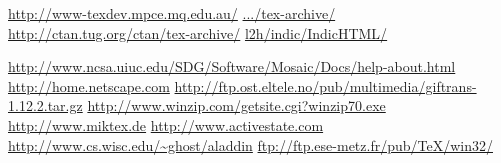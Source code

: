 \begin{htmlonly}
%
\internal{}%
%
%
%
%
%
%

\newcommand{\texdev}[1]{\htmladdnormallink
 {\texdevURL/#1}{\texdevURL/#1}}
\newcommand{\ctan}{http://ctan.tug.org/ctan}
\newcommand{\ctanTUG}{\htmladdnormallinkfoot
 {TUG's searchable CTAN site}{\ctan}}
\newcommand{\ctanURL}[1]{\htmladdnormallink
 {CTAN:\texttt{.../#1}}{\ctan/tex-archive/#1}}
\newcommand{\ctanURLbr}[1]{\htmladdnormallink
 {CTAN:\texttt{.../#1}}{\ctan/tex-archive/#1}}
\newcommand{\ctanTUGurl}[2]{\ctanURL{#2}}
\newcommand{\indichtml}{l2h/indic/IndicHTML/}

\end{htmlonly}

\newcommand{\TUGurl}{\htmladdnormallink{TUG}{\htmlurl{http://www.tug.org}}}

\newcommand{\texdevURL}{http://www-texdev.mpce.mq.edu.au/}
\newcommand{\Unicode}{\htmladdnormallinkfoot
 {Unicode}{http://www.unicode.org/}}
\newcommand{\IndicHTML}{\htmladdnormallinkfoot
 {Indic\TeX/HTML}{\texdevURL{\indichtml}}}

\usepackage{array}

\newcommand{\Cs}[1]{{\upshape`\,\texttt{-#1}\,'}}
\newcommand{\Ve}[1]{\index{#1@\texttt{#1}}{\upshape`\,\texttt{#1}\,'}}
\newcommand{\Lc}[1]{{\upshape\ttfamily\char92#1}}
\newcommand{\Tc}[1]{{\upshape\ttfamily\char92#1}}

\newcommand{\ctanTUG}[1]{TUG's searchable CTAN site\footnote{\ctanTUGurl}}
\newcommand{\ctanURL}{CTAN: \penalty-200\ctanurl}
\newcommand{\ctanURLbr}{CTAN: \newline\ctanurl}
\urldef\texdev\url{http://www-texdev.mpce.mq.edu.au/}
\urldef\ctanurl\url{.../tex-archive/}
\urldef\ctanTUGurl\url{http://ctan.tug.org/ctan/tex-archive/}
\urldef\indichtml\url{l2h/indic/IndicHTML/}

\urldef\MosaicDocs\url{http://www.ncsa.uiuc.edu/SDG/Software/Mosaic/Docs/help-about.html}
\urldef\NetscapeHome\url{http://home.netscape.com}
\urldef\giftransURL\url{http://ftp.ost.eltele.no/pub/multimedia/giftrans-1.12.2.tar.gz}
\urldef\WinZipURL\url{http://www.winzip.com/getsite.cgi?winzip70.exe}
\urldef\MikTeXURL\url{http://www.miktex.de}
\urldef\ActiveStateURL\url{http://www.activestate.com}
\urldef\GhostScriptURL\url{http://www.cs.wisc.edu/~ghost/aladdin}
\urldef\NetpbmWinURL\url{ftp://ftp.ese-metz.fr/pub/TeX/win32/}

\begin{htmlonly}
\newcommand{\MosaicDocs}{\url{http://www.ncsa.uiuc.edu/SDG/Software/Mosaic/Docs/help-about.html}}
\newcommand{\NetscapeHome}{\url{http://home.netscape.com}}
\newcommand{\giftransURL}{\url{http://ftp.ost.eltele.no/pub/multimedia/giftrans-1.12.2.tar.gz}}
\newcommand{\WinZipURL}{\url{http://www.winzip.com/getsite.cgi?winzip70.exe}}
\newcommand{\MikTeXURL}{\url{http://www.miktex.de}}
\newcommand{\ActiveStateURL}{\url{http://www.activestate.com}}
\newcommand{\GhostScriptURL}{\url{http://www.cs.wisc.edu/~ghost/aladdin}}
\newcommand{\NetpbmWinURL}{\url{ftp://ftp.ese-metz.fr/pub/TeX/win32/}}
\end{htmlonly}



